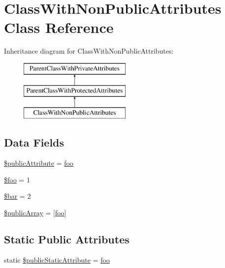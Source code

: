 \hypertarget{class_class_with_non_public_attributes}{}\section{Class\+With\+Non\+Public\+Attributes Class Reference}
\label{class_class_with_non_public_attributes}
Inheritance diagram for Class\+With\+Non\+Public\+Attributes\+:\begin{figure}[H]
\begin{center}
\leavevmode
\includegraphics[height=3.000000cm]{class_class_with_non_public_attributes}
\end{center}
\end{figure}
\subsection*{Data Fields}
\begin{DoxyCompactItemize}
\item 
\mbox{\hyperlink{class_class_with_non_public_attributes_a30ee2d115e202a1577162ee4a2e91cb4}{\$public\+Attribute}} = \textquotesingle{}\mbox{\hyperlink{interfacefoo}{foo}}\textquotesingle{}
\item 
\mbox{\hyperlink{class_class_with_non_public_attributes_a7a1efa8a0f6183fb3a5e8e8b0696526c}{\$foo}} = 1
\item 
\mbox{\hyperlink{class_class_with_non_public_attributes_ab669d165b99e23bf90d68a0a057f69ac}{\$bar}} = 2
\item 
\mbox{\hyperlink{class_class_with_non_public_attributes_af4d62da66e82cc12f440753dc7009d0b}{\$public\+Array}} = \mbox{[}\textquotesingle{}\mbox{\hyperlink{interfacefoo}{foo}}\textquotesingle{}\mbox{]}
\end{DoxyCompactItemize}
\subsection*{Static Public Attributes}
\begin{DoxyCompactItemize}
\item 
static \mbox{\hyperlink{class_class_with_non_public_attributes_ae4fa27a420b4efd5bcbf3eb15b149866}{\$public\+Static\+Attribute}} = \textquotesingle{}\mbox{\hyperlink{interfacefoo}{foo}}\textquotesingle{}
\end{DoxyCompactItemize}
